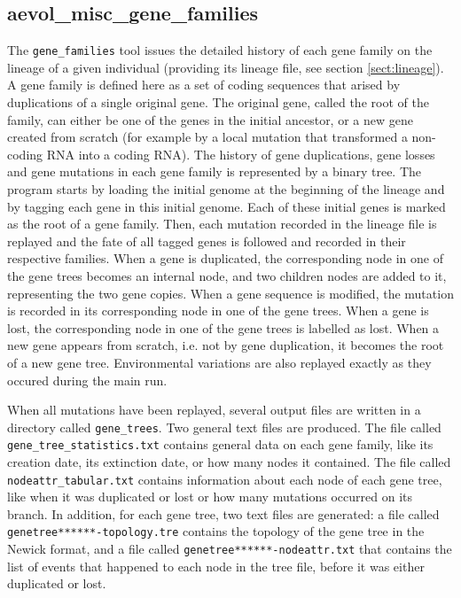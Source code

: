 \subsection{aevol\_misc\_gene\_families}
\label{sect:ancstats}
The \verb?gene_families? tool issues the detailed history of each gene family on the lineage of a given individual (providing its lineage file, see section \ref{sect:lineage}). A gene family is defined here as a set of coding sequences that arised by duplications of a single original gene. The original gene, called the root of the family, can either be one of the genes in the initial ancestor, or a new gene created from scratch (for example by a local mutation that transformed a non-coding RNA into a coding RNA). The history of gene duplications, gene losses and gene mutations in each gene family is represented by a binary tree. The program starts by loading the initial genome at the beginning of the lineage and by tagging each gene in this initial genome. Each of these initial genes is marked as the root of a gene family. Then, each mutation recorded in the lineage file is replayed and the fate of all tagged genes is followed and recorded in their respective families. When a gene is duplicated, the corresponding node in one of the gene trees becomes an internal node, and two children nodes are added to it, representing the two gene copies. When a gene sequence is modified, the mutation is recorded in its corresponding node in one of the gene trees. When a gene is lost, the corresponding node in one of the gene trees is labelled as lost. When a new gene appears from scratch, i.e. not by gene duplication, it becomes the root of a new gene tree. Environmental variations are also replayed exactly as they occured during the main run.

When all mutations have been replayed, several output files are written in a directory called \verb?gene_trees?. Two general text files are produced. The file called \verb?gene_tree_statistics.txt? contains general data on each gene family, like its creation date, its extinction date, or how many nodes it contained. The file called \verb?nodeattr_tabular.txt? contains information about each node of each gene tree, like when it was duplicated or lost or how many mutations occurred on its branch. In addition, for each gene tree, two text files are generated: a file called \verb?genetree******-topology.tre? contains the topology of the gene tree in the Newick format, and a file called \verb?genetree******-nodeattr.txt? that contains the list of events that happened to each node in the tree file, before it was either duplicated or lost.

